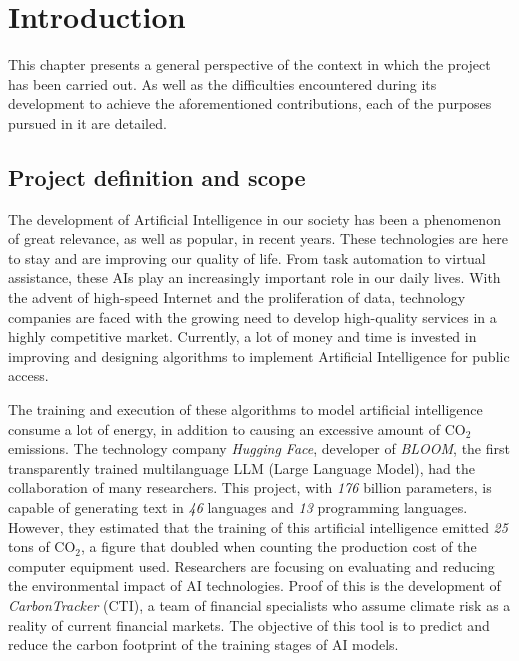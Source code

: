 \chapter*{Introduction}

This chapter presents a general perspective of the context in which the project has been carried out. As well as the difficulties encountered during its development to achieve the aforementioned contributions, each of the purposes pursued in it are detailed.


\section{Project definition and scope}

	The development of Artificial Intelligence in our society has been a phenomenon of great relevance, as well as popular, in recent years. These technologies are here to stay and are improving our quality of life. From task automation to virtual assistance\cite{lugano2017virtual}, these AIs play an increasingly important role in our daily lives.
	With the advent of high-speed Internet and the proliferation of data, technology companies are faced with the growing need to develop high-quality services in a highly competitive market. Currently, a lot of money and time is invested in improving and designing algorithms to implement Artificial Intelligence for public access\cite{thomas2021global}.
	
		
	The training and execution of these algorithms to model artificial intelligence consume a lot of energy, in addition to causing an excessive amount of CO\(_2\) emissions. The technology company \textit{Hugging Face}, developer of \textit{BLOOM}\cite{BloomAI}, the first transparently trained multilanguage LLM (Large Language Model), had the collaboration of many researchers. This project, with \textit{176} billion parameters, is capable of generating text in \textit{46} languages and \textit{13} programming languages. However, they estimated that the training of this artificial intelligence emitted \textit{25} tons of CO\(_2\), a figure that doubled when counting the production cost of the computer equipment used\cite{kirkpatrick2023carbon}. Researchers are focusing on evaluating and reducing the environmental impact of AI technologies. Proof of this is the development of \textit{CarbonTracker}\cite{jeppesen2021carbon} (CTI), a team of financial specialists who assume climate risk as a reality of current financial markets. The objective of this tool is to predict and reduce the carbon footprint of the training stages of AI\cite{mor2021artificial} models.
	
